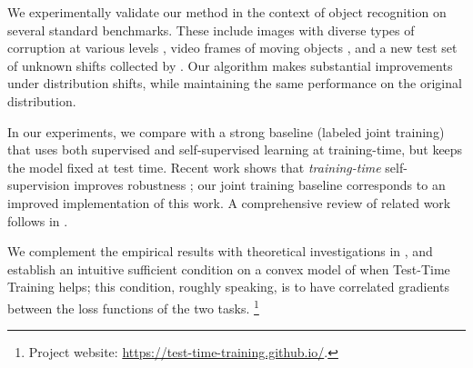 We experimentally validate our method in the context of object recognition on several standard benchmarks. These include images with diverse types of corruption at various levels \citep{hendrycks2019benchmarking},  video frames of moving objects \citep{shankar2019systematic}, and a new test set of unknown shifts collected by \cite{recht2018cifar}. 
Our algorithm makes substantial improvements under distribution shifts, while maintaining the same performance on the original distribution.

In our experiments, we compare with a strong baseline (labeled joint training) that uses both supervised and self-supervised learning at training-time, but keeps the model fixed at test time.
Recent work shows that \emph{training-time} self-supervision improves robustness \citep{hendrycks2019using}; our joint training baseline corresponds to an improved implementation of this work. 
A comprehensive review of related work follows in .

We complement the empirical results with theoretical investigations in , and establish an intuitive sufficient condition on a convex model of when Test-Time Training helps; this condition, roughly speaking, is to have correlated gradients between the loss functions of the two tasks.
\newcommand\blfootnote[1]{%
  \begingroup
  \renewcommand\thefootnote{}\footnote{#1}%
  \addtocounter{footnote}{-1}%
  \endgroup
}
\blfootnote{Project website: {\scriptsize \url{https://test-time-training.github.io/}}.}
\newpage